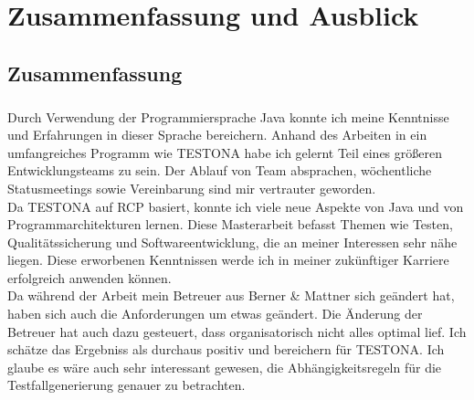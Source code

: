 \chapter{Zusammenfassung und Ausblick}\label{chp:zusammenfassung}



\newpage
\section{Zusammenfassung}
\paragraph{}
Durch Verwendung der Programmiersprache Java konnte ich meine Kenntnisse und Erfahrungen in dieser Sprache bereichern. Anhand des Arbeiten in ein umfangreiches Programm wie TESTONA habe ich gelernt Teil eines größeren Entwicklungsteams zu sein. Der Ablauf von Team absprachen, wöchentliche Statusmeetings sowie Vereinbarung sind mir vertrauter geworden.\\


Da TESTONA auf RCP basiert, konnte ich viele neue Aspekte von Java und von Programmarchitekturen lernen. Diese Masterarbeit befasst Themen wie Testen, Qualitätssicherung und Softwareentwicklung, die an meiner Interessen sehr nähe liegen. Diese erworbenen Kenntnissen werde ich in meiner zukünftiger Karriere erfolgreich anwenden können.\\


Da während der Arbeit mein Betreuer aus Berner \& Mattner sich geändert hat, haben sich auch die Anforderungen um etwas geändert. Die Änderung der Betreuer hat auch dazu gesteuert, dass organisatorisch nicht alles optimal lief. Ich schätze das Ergebniss als durchaus positiv und bereichern für TESTONA. Ich glaube es wäre auch sehr interessant gewesen, die Abhängigkeitsregeln für die Testfallgenerierung genauer zu betrachten.\\


